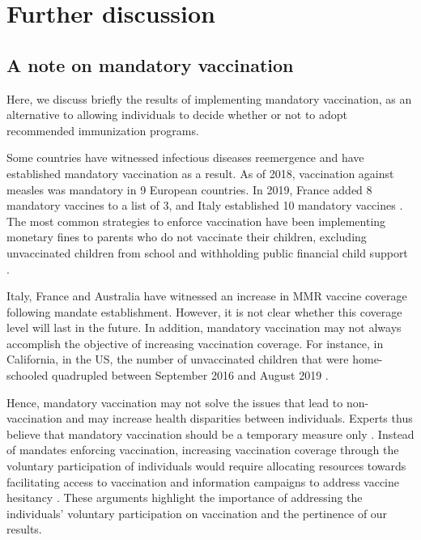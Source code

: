\section{Further discussion}


\subsection{A note on mandatory vaccination}

Here, we discuss briefly the results of implementing mandatory vaccination, as an alternative to allowing individuals to decide whether or not to adopt recommended immunization programs.

Some countries have witnessed infectious diseases reemergence and have established mandatory vaccination as a result. As of 2018, vaccination against measles was mandatory in 9 European countries. In 2019, France added 8 mandatory vaccines to a list of 3, and Italy established 10 mandatory vaccines \cite[]{Bechini2019}. The most common strategies to enforce vaccination have been implementing monetary fines to parents who do not vaccinate their children, excluding unvaccinated children from school \cite[]{Drew2019,Bechini2019} and withholding public financial child support \cite[]{Drew2019,Australia2015}.

Italy, France and Australia have witnessed an increase in MMR vaccine coverage following mandate establishment. However, it is not clear whether this coverage level will last in the future. In addition, mandatory vaccination may not always accomplish the objective of increasing vaccination coverage. For instance, in California, in the US, the number of unvaccinated children that were home-schooled quadrupled between September 2016 and August 2019 \cite[]{Drew2019}. 

Hence, mandatory vaccination may not solve the issues that lead to non-vaccination and may increase health disparities between individuals. Experts thus believe that mandatory vaccination should be a temporary measure only \cite[]{Bechini2019}. Instead of mandates enforcing vaccination, increasing vaccination coverage through the voluntary participation of individuals would require allocating resources towards facilitating access to vaccination and information campaigns to address vaccine hesitancy \cite[]{Drew2019,Bechini2019}. These arguments highlight the importance of addressing the individuals' voluntary participation on vaccination and the pertinence of our results.